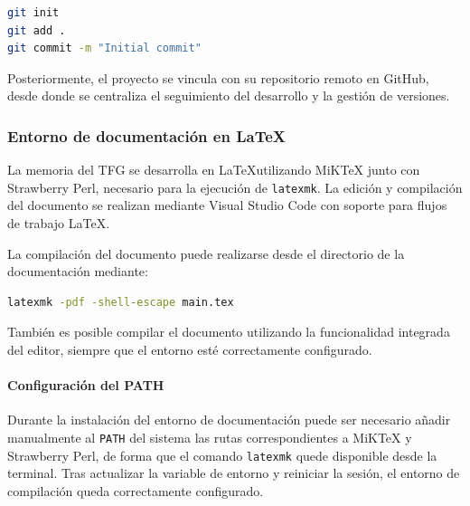 \begin{lstlisting}[language=bash]
git init
git add .
git commit -m "Initial commit"
\end{lstlisting}

Posteriormente, el proyecto se vincula con su repositorio remoto en GitHub, desde donde se centraliza el seguimiento del desarrollo y la gestión de versiones.

\subsubsection*{Entorno de documentación en \LaTeX}

La memoria del TFG se desarrolla en \LaTeX utilizando MiKTeX junto con Strawberry Perl, necesario para la ejecución de \texttt{latexmk}. La edición y compilación del documento se realizan mediante Visual Studio Code con soporte para flujos de trabajo \LaTeX.

La compilación del documento puede realizarse desde el directorio de la documentación mediante:

\begin{lstlisting}[language=bash]
latexmk -pdf -shell-escape main.tex
\end{lstlisting}

También es posible compilar el documento utilizando la funcionalidad integrada del editor, siempre que el entorno esté correctamente configurado.

\paragraph{Configuración del PATH}

Durante la instalación del entorno de documentación puede ser necesario añadir manualmente al \texttt{PATH} del sistema las rutas correspondientes a MiKTeX y Strawberry Perl, de forma que el comando \texttt{latexmk} quede disponible desde la terminal. Tras actualizar la variable de entorno y reiniciar la sesión, el entorno de compilación queda correctamente configurado.